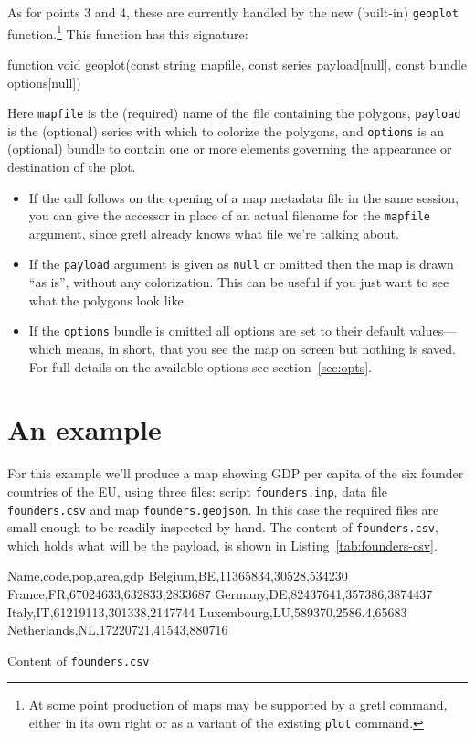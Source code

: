 \documentclass{article}
\begin{document}
As for points 3 and 4, these are currently handled by the new
(built-in) \texttt{geoplot} function.\footnote{At some point
  production of maps may be supported by a gretl command, either in
  its own right or as a variant of the existing \texttt{plot}
  command.} This function has this signature:
\begin{code}
function void geoplot(const string mapfile,
	              const series payload[null],
	              const bundle options[null])
\end{code}
Here \texttt{mapfile} is the (required) name of the file containing
the polygons, \texttt{payload} is the (optional) series with which to
colorize the polygons, and \texttt{options} is an (optional) bundle to
contain one or more elements governing the appearance or destination
of the plot.
\begin{itemize}
\item If the  call follows on the opening of a map
  metadata file in the same session, you can give the accessor
   in place of an actual filename for the
  \texttt{mapfile} argument, since gretl already knows what file we're
  talking about.
\item If the \texttt{payload} argument is given as \texttt{null} or
  omitted then the map is drawn ``as is'', without any
  colorization. This can be useful if you just want to see what the
  polygons look like.
\item If the \texttt{options} bundle is omitted all options are set to
  their default values---which means, in short, that you see the map
  on screen but nothing is saved. For full details on the available
  options see section~\ref{sec:opts}.
\end{itemize}

\section{An example}
\label{sec:example}

For this example we'll produce a map showing GDP per capita of the six
founder countries of the EU, using three files: script
\texttt{founders.inp}, data file \texttt{founders.csv} and map
\texttt{founders.geojson}. In this case the required files are small
enough to be readily inspected by hand.  The content of
\texttt{founders.csv}, which holds what will be the payload, is shown
in Listing~\ref{tab:founders-csv}.

\begin{script}[htbp]
\begin{scode}
Name,code,pop,area,gdp
Belgium,BE,11365834,30528,534230
France,FR,67024633,632833,2833687
Germany,DE,82437641,357386,3874437
Italy,IT,61219113,301338,2147744
Luxembourg,LU,589370,2586.4,65683
Netherlands,NL,17220721,41543,880716
\end{scode}
\caption{Content of \texttt{founders.csv}}
\label{tab:founders-csv}
\end{script}
\end{document}
